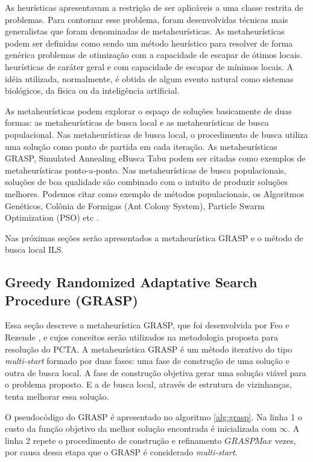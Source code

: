 As heurísticas apresentavam a restrição de ser aplicáveis a uma classe restrita de problemas. Para contornar esse problema, foram desenvolvidas técnicas mais generalistas que foram denominadas de metaheurísticas. As metaheurísticas podem ser definidas como sendo um método heurístico para resolver de forma genérica problemas de otimização com a capacidade de escapar de ótimos locais. heurísticas de caráter geral e com capacidade de escapar de mínimos locais. A idéia utilizada, normalmente, é obtida de algum evento natural como sistemas biológicos, da física ou da inteligência artificial.

As metaheurísticas podem explorar o espaço de soluções basicamente de duas formas: as metaheurísticas de busca local e as metaheurísticas de busca populacional. Nas metaheurísticas de busca local, o procedimento de busca utiliza uma solução como ponto de partida em cada iteração. As metaheurísticas GRASP, Simulated Annealing eBusca Tabu podem ser citadas como exemplos de metaheurísticas ponto-a-ponto. Nas metaheurísticas de busca populacionais, soluções de boa qualidade são combinado com o intuito de produzir soluções melhores. Podemos citar como exemplo de métodos populacionais, os Algoritmos Genéticos, Colônia de Formigas (Ant Colony System), Particle Swarm Optimization (PSO) etc \cite{maritan2009}.

Nas próximas seções serão apresentados a metaheurística GRASP e o método de busca local ILS.

\subsection{Greedy Randomized Adaptative Search Procedure (GRASP)}

Essa seção descreve a metaheurística GRASP, que foi  desenvolvida por Feo e Rezende \cite{resende1995}, e cujos conceitos serão utilizados na metodologia proposta para resolução do PCTA.
A metaheurística GRASP é um método iterativo do tipo \textit{multi-start} formado por duas fases: uma fase de construção de uma solução e outra de busca local. A fase de construção objetiva gerar uma solução viável para o problema proposto. E a de busca local, através de estrutura de vizinhanças, tenta melhorar essa solução. 

O pseudocódigo do GRASP é apresentado no algoritmo \ref{alg:grasp}. Na linha 1 o custo da função objetivo da melhor solução encontrada é inicializada com $\infty$. A linha 2 repete o procedimento de construção e refinamento $GRASPMax$ vezes, por causa dessa etapa que o GRASP é considerado \textit{multi-start}.

